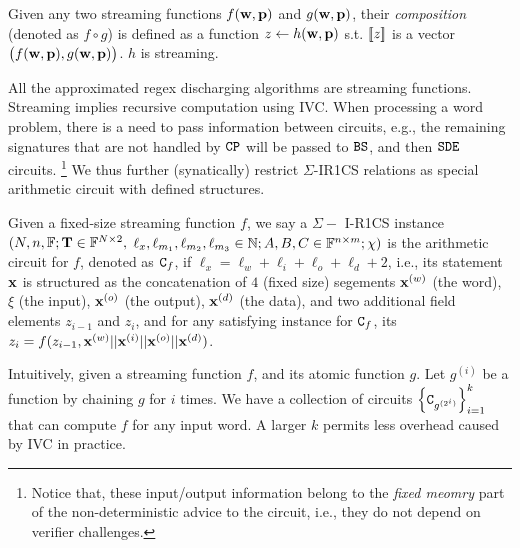 \begin{lemma} Given any two streaming functions $f({{\mathbf {w}}}, {{\mathbf {p}}})$
and $g({{\mathbf {w}}}, {{\mathbf {p}}})$, their {\em composition} 
(denoted as $f \circ g$) is defined
as a function $z\leftarrow h({{\mathbf {w}}}, {{\mathbf {p}}})$ s.t. $[\![z]\!]$
is a vector $\big(f({{\mathbf {w}}}, {{\mathbf {p}}}), g({{\mathbf {w}}}, {{\mathbf {p}}})\big)$.
$h$ is streaming.
\end{lemma}

All the approximated regex discharging algorithms are streaming functions.
Streaming implies recursive computation using IVC.
When processing a word problem, there is a need to pass
information between circuits, e.g., the remaining signatures
that are not handled by $\texttt{CP}$ will be passed to $\texttt{BS}$, and then 
$\texttt{SDE}$ circuits. 
\footnote{Notice that, these input/output information belong to the
{\em fixed meomry} part of the non-deterministic advice
to the circuit, i.e., they do not depend on verifier challenges.}
We thus further (synatically) restrict $\Sigma$-IR1CS relations
as special arithmetic circuit with defined structures.

\begin{definition}  Given a fixed-size streaming function $f$,
we say a $\Sigma-$ I-R1CS instance 
$(N, n, \mathbb{F}; {{\mathbf {T}}} \in \mathbb{F}^{N\times 2}, $
$\ell_x, \ell_{m_1}, \ell_{m_2}, \ell_{m_3} \in \mathbb{N}; 
A,B,C \in \mathbb{F}^{n\times m}; \chi)$
 is the arithmetic circuit for $f$, denoted as ${\texttt{C}}_{f}$,
if $\ell_x = \ell_w + \ell_i + \ell_o + \ell_d + 2$, i.e.,
its statement ${{\mathbf {x}}}$ is structured as the concatenation
of $4$ (fixed size) segements ${{\mathbf {x}}}^{(w)}$ (the word),
$\xi$ (the input), ${{\mathbf {x}}}^{(o)}$ (the output), ${{\mathbf {x}}}^{(d)}$ (the data),
and two additional field elements $z_{i-1}$ and $z_{i}$,
and for any satisfying instance for ${\texttt{C}}_{f}$, its
$z_i = f(z_{i-1}, {{\mathbf {x}}}^{(w)} || {{\mathbf {x}}}^{(i)} || {{\mathbf {x}}}^{(o)} || {{\mathbf {x}}}^{(d)})$. 
\end{definition}

Intuitively, given a streaming function $f$, and its atomic
function $g$. Let $g^{(i)}$ be a function by chaining $g$ for $i$ times.
We have a collection of circuits 
$\left\{{\texttt{C}}_{g^{(2^i)}}\right\}_{i=1}^k$
that can compute $f$ for any input word. A larger $k$ permits
less overhead caused by IVC in practice.


